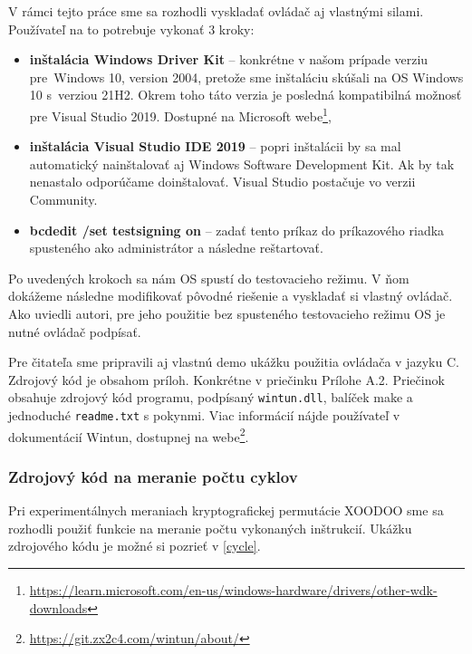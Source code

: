 V rámci tejto práce sme sa rozhodli vyskladať ovládač aj vlastnými silami. Používateľ na to potrebuje vykonať 3 kroky: 
\begin{itemize}
	\item\textbf{inštalácia Windows Driver Kit} -- konkrétne v našom prípade verziu pre~Windows 10, version 2004, pretože sme inštaláciu skúšali na OS Windows 10 s~verziou 21H2. Okrem toho táto verzia je posledná kompatibilná možnosť pre Visual Studio 2019. Dostupné na Microsoft webe\footnote{\url{https://learn.microsoft.com/en-us/windows-hardware/drivers/other-wdk-downloads}},
	\item\textbf{inštalácia Visual Studio IDE 2019} -- popri inštalácii by sa mal automatický nainštalovať aj Windows Software Development Kit. Ak by tak nenastalo odporúčame doinštalovať. Visual Studio postačuje vo verzii Community.  
	\item\textbf{bcdedit /set testsigning on} -- zadať tento príkaz do príkazového riadka spusteného ako administrátor a následne reštartovať. 
\end{itemize}  
Po uvedených krokoch sa nám OS spustí do testovacieho režimu. V ňom dokážeme následne modifikovať pôvodné riešenie a vyskladať si vlastný ovládač. Ako uviedli autori, pre jeho použitie bez spusteného testovacieho režimu OS je nutné ovládač podpísať. 

Pre čitateľa sme pripravili aj vlastnú demo ukážku použitia ovládača v jazyku C. Zdrojový kód je obsahom príloh. Konkrétne v priečinku Prílohe A.2. Priečinok obsahuje zdrojový kód programu, podpísaný \lstinline|wintun.dll|, balíček make a jednoduché \lstinline|readme.txt| s pokynmi.
Viac informácií nájde používateľ v dokumentácií Wintun, dostupnej na webe\footnote{\url{https://git.zx2c4.com/wintun/about/}}.
   
\subsubsection{Zdrojový kód na meranie počtu cyklov} 
Pri experimentálnych meraniach kryptografickej permutácie XOODOO sme sa rozhodli použiť funkcie na meranie počtu vykonaných inštrukcií. Ukážku zdrojového kódu je možné si pozrieť v \ref{cycle}.

